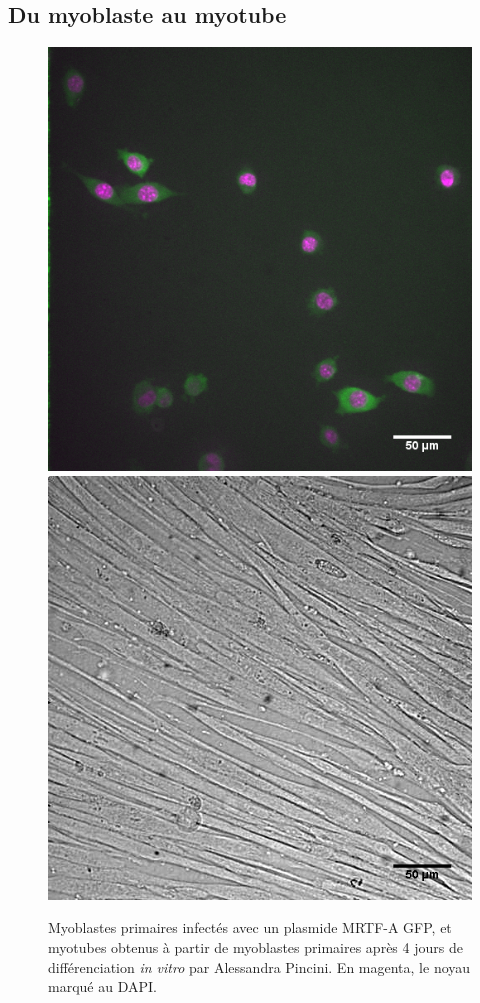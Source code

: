 \subsection{Du myoblaste au myotube}

\begin{figure}
\includegraphics[scale=0.25]{Figures/Myocytes.png} \includegraphics[scale=0.25]{Figures/Myotubes_flox_D4.png} 
\caption{Myoblastes primaires infectés avec un plasmide MRTF-A GFP, et myotubes obtenus à partir de myoblastes primaires après 4 jours de différenciation \textit{in vitro} par Alessandra Pincini. En magenta, le noyau marqué au DAPI.}
\end{figure}


